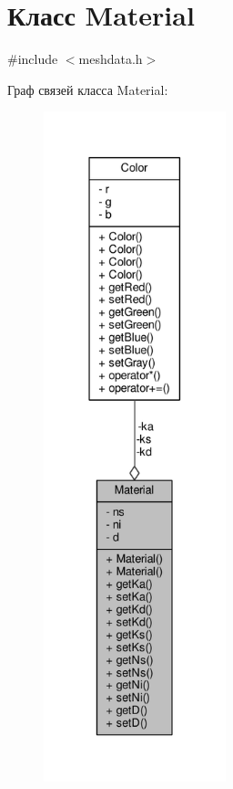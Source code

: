 \hypertarget{class_material}{}\section{Класс Material}
\label{class_material}


{\ttfamily \#include $<$meshdata.\+h$>$}



Граф связей класса Material\+:
\nopagebreak
\begin{figure}[H]
\begin{center}
\leavevmode
\includegraphics[height=550pt]{d5/dad/class_material__coll__graph}
\end{center}
\end{figure}
